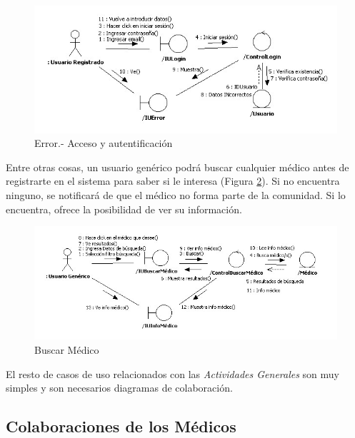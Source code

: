 		\begin{figure}[H]
		  \centering
		    \includegraphics[width=16cm]{img/jpg/colaboraciones/24_AccesoyautentificacionError.jpg}
		  \caption{Error.- Acceso y autentificación}
		  \label{fig:col_acc_y_aut_err}
		\end{figure}
		
		Entre otras cosas, un usuario genérico podrá buscar cualquier médico antes de registrarte en el sistema para saber si le interesa (Figura \ref{fig:col_buscarmedico}). Si no encuentra ninguno, se notificará de que el médico no forma parte de la comunidad. Si lo encuentra, ofrece la posibilidad de ver su información.
		
		\begin{figure}[H]
		  \centering
		    \includegraphics[width=16cm]{img/jpg/colaboraciones/22_BuscarMedico.jpg}
		  \caption{Buscar Médico}
		  \label{fig:col_buscarmedico}
		\end{figure}
		
		El resto de casos de uso relacionados con las \textit{Actividades Generales} son muy simples y son necesarios diagramas de colaboración.
		
	
	\newpage
	\subsection{Colaboraciones de los Médicos} %
	\label{sub:colaboraciones_de_los_medicos}
	
